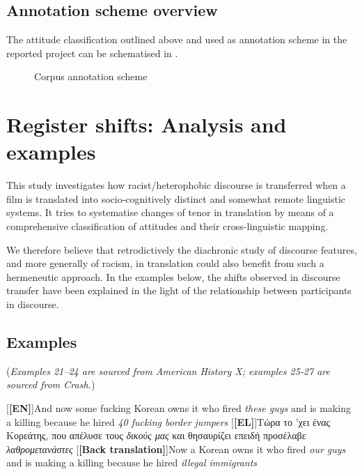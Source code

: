 \documentclass[output=paper]{LSP/langsci}
\begin{document}
\subsection{Annotation scheme overview} \label{sec:2:4:4}
The attitude classification outlined above and used as annotation scheme in the reported project can be schematised in .

\begin{figure}

\caption{Corpus annotation scheme} \label{fig:2:4} 
\end{figure}

\section{Register shifts: Analysis and examples} \label{sec:2:5}

This study investigates how racist/heterophobic discourse is transferred when a film is translated into socio-cognitively distinct and somewhat remote linguistic systems. It tries to systematise changes of tenor \citep{Halliday1978} in translation by means of a comprehensive classification of attitudes and their cross-linguistic mapping.

We therefore believe that retrodictively \citep{Wright1971,Chesterman2008} the diachronic study of discourse features, and more generally of racism, in translation could also benefit from such a hermeneutic approach. In the examples below, the shifts observed in discourse transfer have been explained in the light of the relationship between participants in discourse.

\subsection{Examples} \label{sec:2:5:1} 
(\textit{Examples 21--24 are sourced from American History X; examples 25-27 are sourced from Crash.})

\ea \label{ex:2:21}
\begin{xlist}
\exi{}[\textbf{[EN]}]{And now some fucking Korean owns it who fired \emph{these guys} and is making a killing because he hired \emph{40 fucking border jumpers}}
\exi{}[\textbf{[EL]}]{Τώρα το 'χει ένας Κορεάτης, που απέλυσε τους \emph{δικούς μας} και θησαυρίζει επειδή προσέλαβε \emph{λαθρομετανάστες}}
\exi{}[\textbf{[Back translation]}]{Now a Korean owns it who fired \emph{our guys }and is making a killing because he hired \emph{illegal immigrants}}
\end{xlist}
\z
\end{document}
